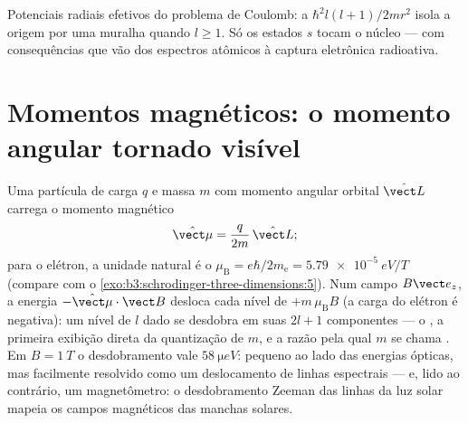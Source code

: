\begin{omfigure}

{\small Potenciais radiais efetivos do problema de Coulomb: a  $\hbar^2l(l+1)/2mr^2$ isola a origem por uma muralha quando
$l \ge 1$. Só os estados $s$ tocam o núcleo --- com consequências que
vão dos espectros atômicos à captura eletrônica radioativa.}
\end{omfigure}

\section{Momentos magnéticos: o momento angular tornado visível}

\begin{proposition}\label{prop:b3:quantum-angular-momentum:magnetic}
Uma partícula de carga $q$ e massa $m$ com momento angular orbital
$\hat{\vect L}$ carrega o momento magnético
\[
\hat{\vect\mu} = \frac{q}{2m}\,\hat{\vect L} ;
\]
para o elétron, a unidade natural é o \emph{}
$\mu_{\text{B}} = e\hbar/2m_{\text{e}} = \qty{5.79e-5}{eV/T}$
(compare com o \cref{exo:b3:schrodinger-three-dimensions:5}). Num campo
$B\vect e_z$, a energia $-\hat{\vect\mu}\cdot\vect B$ desloca cada
nível de $+m\,\mu_{\text{B}}B$ (a carga do elétron é negativa): um
nível de $l$ dado se desdobra em suas $2l + 1$ componentes --- o
\emph{}, a primeira exibição direta da quantização de $m$,
e a razão pela qual $m$ se chama . Em
$B = \qty{1}{T}$ o desdobramento vale $\qty{58}{\micro eV}$: pequeno ao
lado das energias ópticas, mas facilmente resolvido como um
deslocamento de linhas espectrais --- e, lido ao contrário, um
magnetômetro: o desdobramento Zeeman das linhas da luz solar mapeia os
campos magnéticos das manchas solares.
\end{proposition}

